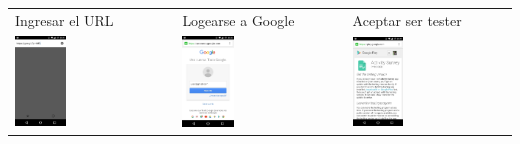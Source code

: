 \begin{table}[!htbp]
\begin{tabular}{lll}
\textsf{\relax 
Ingresar el URL
} & \textsf{\relax 
Logearse a Google
} & \textsf{\relax 
Aceptar ser tester
}\\
    {\includegraphics[width=0.33\textwidth]{anexos/graphics/inst_app.jpg}}
 & 
    {\includegraphics[width=0.33\textwidth]{anexos/graphics/inst_app2.jpg}}
 & 
    {\includegraphics[width=0.33\textwidth]{anexos/graphics/inst_app4.jpg}}
\\
\end{tabular}
\end{table}


